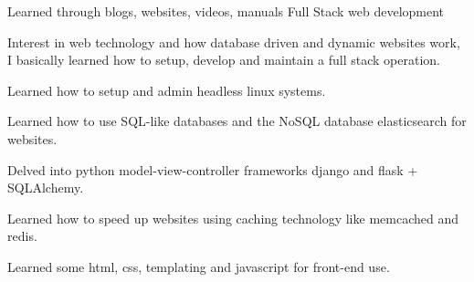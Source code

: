\begin{cventries}
\cventry
  {Learned through blogs, websites, videos, manuals} %
  {Full Stack web development} %
  {} %
  {} %
  {
    \begin{cvitems} %
      \item {Interest in web technology and how database driven and dynamic websites work, I basically learned how to setup, develop and maintain a full stack operation.}
      \item {Learned how to setup and admin headless linux systems.}
      \item {Learned how to use SQL-like databases and the NoSQL database elasticsearch for websites.}
      \item {Delved into python model-view-controller frameworks django and flask + SQLAlchemy.}
      \item {Learned how to speed up websites using caching technology like memcached and redis.}
      \item {Learned some html, css, templating and javascript for front-end use.}
    \end{cvitems}
  }


\end{cventries}
